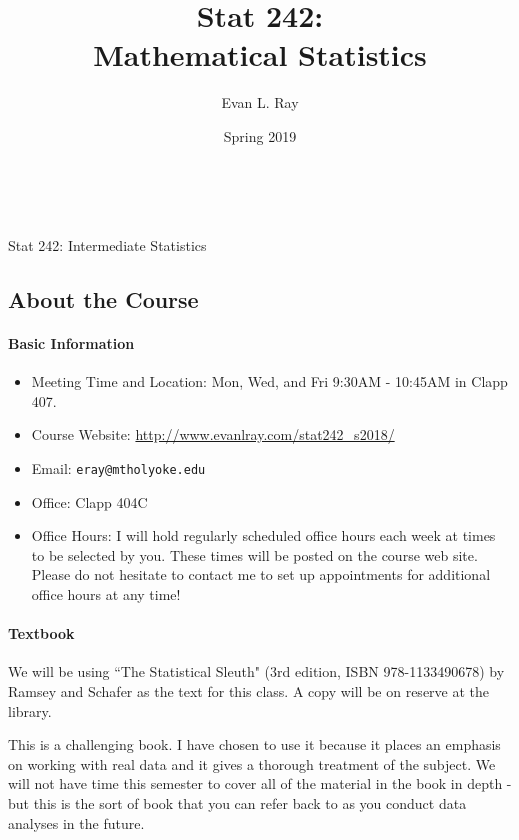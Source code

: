 \documentclass[11pt]{article}
\title{Stat 242:\\Mathematical Statistics}
\author{Evan L. Ray}
\date{Spring 2019}
\begin{document}
	
	\ \\
	\vspace{.01in}
	\begin{center}
		{\large Stat 242: Intermediate Statistics}
	\end{center}
	\subsection*{About the Course}
	
	\paragraph{Basic Information}  
	
	\begin{itemize}
		\item Meeting Time and Location: Mon, Wed, and Fri 9:30AM - 10:45AM in Clapp 407.
		\item Course Website: \url{http://www.evanlray.com/stat242_s2018/}
		\item Email: \texttt{eray@mtholyoke.edu}
		\item Office: Clapp 404C
		\item Office Hours: I will hold regularly scheduled office hours each week at times to be selected by you.  These times will be posted on the course web site.  Please do not hesitate to contact me to set up appointments for additional office hours at any time!
	\end{itemize}
	
	\paragraph{Textbook}
	
	We will be using ``The Statistical Sleuth" (3rd edition, ISBN 978-1133490678) by Ramsey and Schafer as the text for this class.  A copy will be on reserve at the library.
	
	This is a challenging book.  I have chosen to use it because it places an emphasis on working with real data and it gives a thorough treatment of the subject.  We will not have time this semester to cover all of the material in the book in depth - but this is the sort of book that you can refer back to as you conduct data analyses in the future.
	
\end{document}

